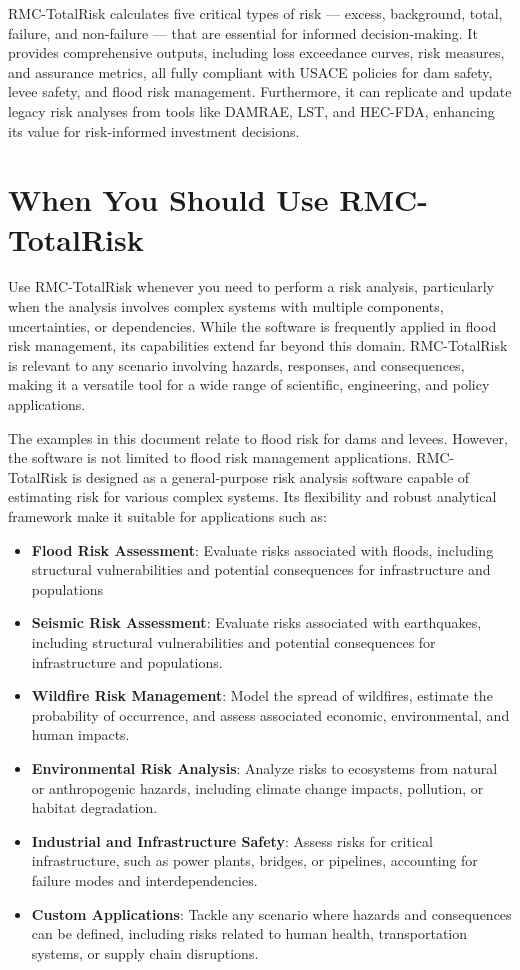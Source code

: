 \documentclass[
]{book}
\begin{document}
RMC-TotalRisk calculates five critical types of risk --- excess, background, total, failure, and non-failure --- that are essential for informed decision-making. It provides comprehensive outputs, including loss exceedance curves, risk measures, and assurance metrics, all fully compliant with USACE policies for dam safety, levee safety, and flood risk management. Furthermore, it can replicate and update legacy risk analyses from tools like DAMRAE, LST, and HEC-FDA, enhancing its value for risk-informed investment decisions.

\hypertarget{when-you-should-use-rmc-totalrisk}{%
\section{When You Should Use RMC-TotalRisk}\label{when-you-should-use-rmc-totalrisk}}

Use RMC-TotalRisk whenever you need to perform a risk analysis, particularly when the analysis involves complex systems with multiple components, uncertainties, or dependencies. While the software is frequently applied in flood risk management, its capabilities extend far beyond this domain. RMC-TotalRisk is relevant to any scenario involving hazards, responses, and consequences, making it a versatile tool for a wide range of scientific, engineering, and policy applications.

The examples in this document relate to flood risk for dams and levees. However, the software is not limited to flood risk management applications. RMC-TotalRisk is designed as a general-purpose risk analysis software capable of estimating risk for various complex systems. Its flexibility and robust analytical framework make it suitable for applications such as:

\begin{itemize}
\item
  \textbf{Flood Risk Assessment}: Evaluate risks associated with floods, including structural vulnerabilities and potential consequences for infrastructure and populations
\item
  \textbf{Seismic Risk Assessment}: Evaluate risks associated with earthquakes, including structural vulnerabilities and potential consequences for infrastructure and populations.
\item
  \textbf{Wildfire Risk Management}: Model the spread of wildfires, estimate the probability of occurrence, and assess associated economic, environmental, and human impacts.
\item
  \textbf{Environmental Risk Analysis}: Analyze risks to ecosystems from natural or anthropogenic hazards, including climate change impacts, pollution, or habitat degradation.
\item
  \textbf{Industrial and Infrastructure Safety}: Assess risks for critical infrastructure, such as power plants, bridges, or pipelines, accounting for failure modes and interdependencies.
\item
  \textbf{Custom Applications}: Tackle any scenario where hazards and consequences can be defined, including risks related to human health, transportation systems, or supply chain disruptions.
\end{itemize}
\end{document}
